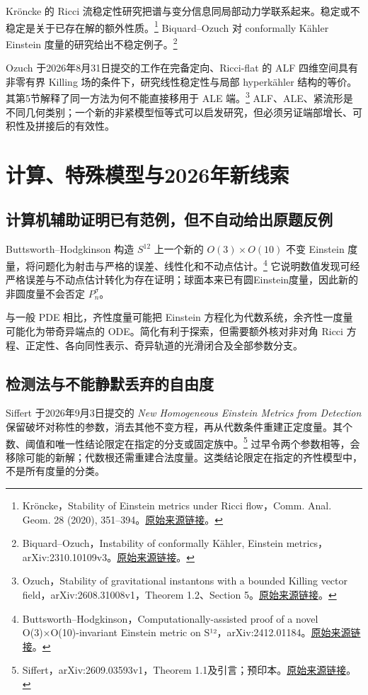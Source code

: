 \documentclass[11pt,a4paper]{article}
\theoremstyle{definition}
\newcommand{\src}[3]{\footnote{\raggedright #1，#2。\href{#3}{原始来源链接}。}}
\begin{document}
Kröncke 的 Ricci 流稳定性研究把谱与变分信息同局部动力学联系起来。稳定或不稳定是关于已存在解的额外性质。\src{Kröncke}{Stability of Einstein metrics under Ricci flow，Comm. Anal. Geom. 28 (2020), 351--394}{https://doi.org/10.4310/CAG.2020.v28.n2.a5}
Biquard--Ozuch 对 conformally Kähler Einstein 度量的研究给出不稳定例子。\src{Biquard--Ozuch}{Instability of conformally Kähler, Einstein metrics，arXiv:2310.10109v3}{https://arxiv.org/abs/2310.10109v3}

Ozuch 于2026年8月31日提交的工作在完备定向、Ricci-flat 的 ALF 四维空间具有非零有界 Killing 场的条件下，研究线性稳定性与局部 hyperkähler 结构的等价。其第5节解释了同一方法为何不能直接移用于 ALE 端。\src{Ozuch}{Stability of gravitational instantons with a bounded Killing vector field，arXiv:2608.31008v1，Theorem 1.2、Section 5}{https://arxiv.org/html/2608.31008v1}
ALF、ALE、紧流形是不同几何类别；一个新的非紧模型恒等式可以启发研究，但必须另证端部增长、可积性及拼接后的有效性。

\section{计算、特殊模型与2026年新线索}

\subsection{计算机辅助证明已有范例，但不自动给出原题反例}

Buttsworth--Hodgkinson 构造 $S^{12}$ 上一个新的 $O(3)\times O(10)$ 不变 Einstein 度量，将问题化为射击与严格的误差、线性化和不动点估计。\src{Buttsworth--Hodgkinson}{Computationally-assisted proof of a novel O(3)×O(10)-invariant Einstein metric on S¹²，arXiv:2412.01184}{https://arxiv.org/abs/2412.01184}
它说明数值发现可经严格误差与不动点估计转化为存在证明；球面本来已有圆Einstein度量，因此新的非圆度量不会否定 $P_n^\sigma$。

与一般 PDE 相比，齐性度量可能把 Einstein 方程化为代数系统，余齐性一度量可能化为带奇异端点的 ODE。简化有利于探索，但需要额外核对非对角 Ricci 方程、正定性、各向同性表示、奇异轨道的光滑闭合及全部参数分支。

\subsection{检测法与不能静默丢弃的自由度}

Siffert 于2026年9月3日提交的 \emph{New Homogeneous Einstein Metrics from Detection} 保留破坏对称性的参数，消去其他不变方程，再从代数条件重建正定度量。其个数、阈值和唯一性结论限定在指定的分支或固定族中。\src{Siffert}{arXiv:2609.03593v1，Theorem 1.1及引言；预印本}{https://arxiv.org/html/2609.03593v1}
过早令两个参数相等，会移除可能的新解；代数根还需重建合法度量。这类结论限定在指定的齐性模型中，不是所有度量的分类。
\end{document}
